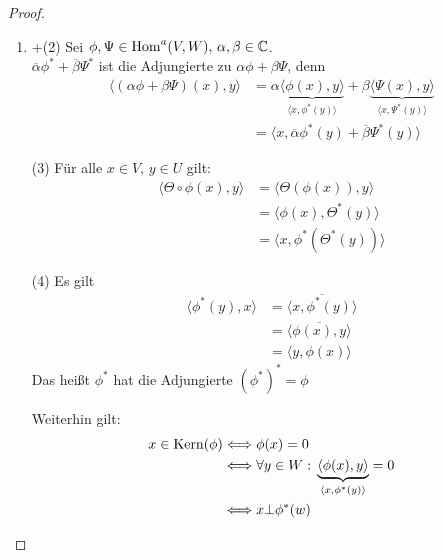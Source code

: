 \documentclass[parskip,a4paper,twoside,DIV15,BCOR12mm]{scrbook}
\begin{document}
\begin{proof}
\begin{enumerate}
\item +(2) %
Sei \(\phi,\Psi\in\operatorname{Hom}^{a}(V,W),\,\alpha,\beta\in\mathbb{C}\).\\
\(\overline{\alpha}\phi^{*}+\overline{\beta}\Psi^{*}\) ist die Adjungierte zu
\(\alpha\phi+\beta\Psi\), denn
\begin{align*}
\langle(\alpha\phi+\beta\Psi)(x),y\rangle
    &=\alpha\underbrace{\langle\phi(x),y\rangle}_{\langle x,\phi^{*}(y)\rangle}
    +\beta\underbrace{\langle\Psi(x),y\rangle}_{\langle x,\Psi^{*}(y)\rangle}\\
&=\langle x,\overline{\alpha}\phi^{*}(y)+\overline{\beta}\Psi^{*}(y)\rangle
\end{align*}
\item[(3)] Für alle \(x\in V,\,y\in U\) gilt:
\begin{align*}
\langle\Theta\circ\phi(x),y\rangle&=\langle\Theta(\phi(x)),y\rangle\\
&=\langle\phi(x),\Theta^{*}(y)\rangle\\
&=\langle x,\phi^{*}(\Theta^{*}(y))\rangle
\end{align*}
\item[(4)] Es gilt
\begin{align*}
\langle\phi^{*}(y),x\rangle&=\overline{\langle x,\phi^{*}(y)\rangle}\\
&=\overline{\langle\phi(x),y\rangle}\\
&=\langle y,\phi(x)\rangle
\end{align*}
Das heißt \(\phi^{*}\) hat die Adjungierte \(\left(\phi^{*}\right)^{*}=\phi\)

Weiterhin gilt:
\begin{align*}
x\in\operatorname{Kern}(\phi)&\Longleftrightarrow\phi(x)=0\\
&\Longleftrightarrow\forall y\in W:\,\underbrace{\langle\phi(x),y\rangle}_{\langle x,\phi^{*}(y)\rangle}=0\\
&\Longleftrightarrow x\bot\phi^{*}(w)
\end{align*}
\end{enumerate}
\end{proof}
\end{document}
